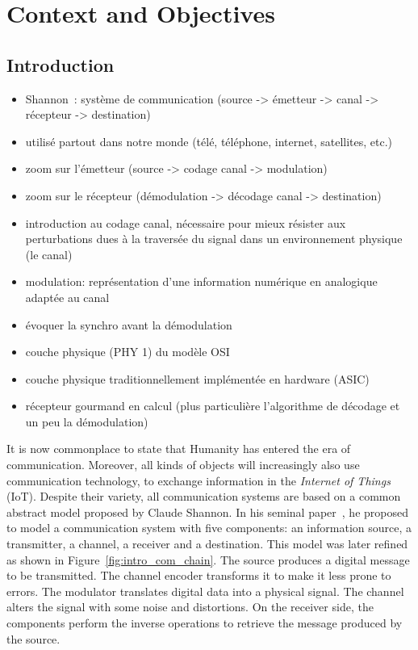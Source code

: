 \graphicspath{{main/chapter1/fig/}}

\chapter{Context and Objectives}

\minitoccustom

\section{Introduction}

\begin{itemize}
  \item Shannon~\cite{Shannon1948}: système de communication (source -> émetteur
    -> canal -> récepteur -> destination)
  \item utilisé partout dans notre monde (télé, téléphone, internet, satellites,
    etc.)
  \item zoom sur l'émetteur (source -> codage canal -> modulation)
  \item zoom sur le récepteur (démodulation -> décodage canal -> destination)
  \item introduction au codage canal, nécessaire pour mieux résister aux
    perturbations dues à la traversée du signal dans un environnement physique
    (le canal)
  \item modulation: représentation d'une information numérique en analogique
    adaptée au canal
  \item évoquer la synchro avant la démodulation
  \item couche physique (PHY 1) du modèle OSI
  \item couche physique traditionnellement implémentée en hardware (ASIC)
  \item récepteur gourmand en calcul (plus particulière l'algorithme de décodage
    et un peu la démodulation)
\end{itemize}

It is now commonplace to state that Humanity has entered the era of
communication. Moreover, all kinds of objects will increasingly also use
communication technology, to exchange information in the \emph{Internet of
Things} (IoT). Despite their variety, all communication systems are based on a
common abstract model proposed by Claude Shannon. In his seminal
paper~\cite{Shannon1948}, he proposed to model a communication system with five
components: an information source, a transmitter, a channel, a receiver and a
destination. This model was later refined as shown in
Figure~\ref{fig:intro_com_chain}. The source produces a digital message to be
transmitted. The channel encoder transforms it to make it less prone to errors.
The modulator translates digital data into a physical signal. The channel alters
the signal with some noise and distortions. On the receiver side, the components
perform the inverse operations to retrieve the message produced by the source.

